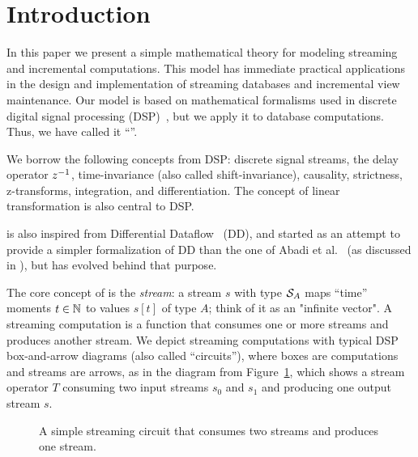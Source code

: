 \section{Introduction}\label{sec:ntro}

In this paper we present a simple mathematical theory for modeling
streaming and incremental computations.  This model has immediate
practical applications in the design and implementation of streaming databases
and incremental view maintenance.  Our model is based on mathematical formalisms 
used in discrete digital signal processing (DSP)~\cite{rabiner-book75},
but we apply it to database computations.  
Thus, we have called it ``\dbsp''.  

We borrow the following concepts from DSP: discrete signal streams, the
delay operator $z^{-1}$, time-invariance (also called shift-invariance), causality,
strictness, z-transforms, integration, and differentiation.  The concept of
linear transformation is also central to DSP.

\dbsp is also inspired from Differential 
Dataflow~\cite{mcsherry-cidr13} (DD), and started as an attempt to provide a simpler
formalization of DD than the one of Abadi et al.~\cite{abadi-fossacs15} 
(as discussed in ), but has evolved behind that purpose.

The core concept of \dbsp is the \emph{stream}: a stream $s$ with type 
$\mathcal{S}_{A}$ maps ``time'' moments $t\in\mathbb{N}$ 
to values $s[t]$ of type $A$; think of it as an "infinite vector".
A streaming computation is a function that
consumes one or more streams and produces another stream.  We depict
streaming computations with typical DSP box-and-arrow diagrams (also called ``circuits''),
where boxes are computations and streams are arrows, as in the diagram from Figure~\ref{fig:stream},
which shows a stream operator $T$ consuming two input streams $s_0$ and $s_1$ 
and producing one output stream $s$.

\begin{figure}
\begin{center}
\vspace{-.2cm}
\caption{A simple streaming circuit that consumes two streams and produces one stream.\label{fig:stream}}
\end{center}
\end{figure}

